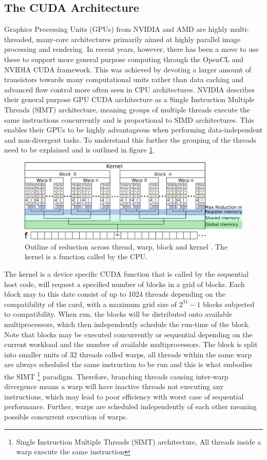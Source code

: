 \documentclass{llncs}
\begin{document}
\subsection{The CUDA Architecture} \label{Cuda} %
Graphics Processing Units (GPUs) from NVIDIA and AMD are highly multi-threaded, many-core architectures primarily aimed at highly parallel image processing and rendering. In recent years, however, there has been a move to use these to support more general purpose computing through the OpenCL and NVIDIA CUDA framework. This was achieved by devoting a larger amount of transistors towards many computational units rather than data caching and advanced  flow control more often seen in CPU architectures. NVIDIA describes their general purpose GPU CUDA architecture as a Single Instruction Multiple Threads (SIMT) architecture, meaning groups of multiple threads execute the same instructions concurrently and is proportional to SIMD architectures. 
This enables their GPUs to be highly advantageous when performing data-independent and non-divergent tasks. To understand this further the grouping of the threads need to be explained and is outlined in figure \ref{fig:reduction}.
\begin{figure}
\centering
\includegraphics[width=\linewidth]{reduction}
\caption{Outline of reduction across thread, warp, block and kernel \label{fig:reduction}. The kernel is a function called by the CPU.}
\end{figure}
The kernel is a device specific CUDA function that is called by the sequential host code, will request a specified number of blocks in a grid of blocks. Each block may to this date consist of up to 1024 threads depending on the compatibility of the card, with a maximum grid size of $2^{31}-1$ blocks subjected to compatibility. When run, the blocks will be distributed onto available multiprocessors, which then independently schedule the run-time of the block. Note that blocks may be executed concurrently or sequential depending on the current workload and the number of available multiprocessors. The block is split into smaller units of 32 threads called warps, all threads within the same warp are always scheduled the same instruction to be run and this is what embodies the SIMT \footnote{Single Instruction Multiple Threads (SIMT) architecture, All threads inside a warp execute the same instruction} paradigm.  Therefore, branching threads causing inter-warp divergence means a warp will have inactive threads not executing any instructions,  which may lead to poor efficiency with worst case of sequential performance. Further, warps are scheduled independently of each other meaning possible concurrent execution of warps.
\end{document}
